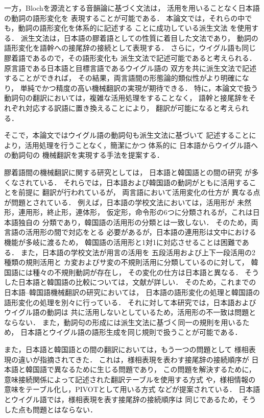 一方，Bloch\cite{BLOCH}を源流とする音韻論に基づく文法は，
活用を用いることなく日本語の動詞の語形変化を
表現することが可能である．
本論文では，それらの中でも，動詞の語形変化を体系的に記述する
ことに成功している派生文法\cite{KIYOSE1}\cite{KIYOSE2}
を使用する．
派生文法は，日本語の膠着語としての性質に着目した文法であり，
動詞の語形変化を語幹への接尾辞の接続として表現する．
さらに，ウイグル語も同じ膠着語であるので，その語形変化も
派生文法で記述可能であると考えられる．
原言語である日本語と目標言語であるウイグル語の
双方を共に派生文法で記述することができれば，
その結果，両言語間の形態論的類似性がより明確になり，
単純でかつ精度の高い機械翻訳の実現が期待できる．
特に，本論文で扱う動詞句の翻訳においては，複雑な活用処理をすることなく，
語幹と接尾辞をそれぞれ対応する訳語に置き換えることにより，
翻訳が可能になると考えられる．

そこで，本論文ではウイグル語の動詞句も派生文法に基づいて
記述することにより，活用処理を行うことなく，簡潔にかつ
体系的に
日本語からウイグル語への動詞句の
機械翻訳を実現する手法を提案する．

膠着語間の機械翻訳に関する研究としては，
日本語と韓国語との間の研究\cite{H_LEE1990}\cite{S_LEE1992}
\cite{J_KIM1996_2}\cite{J_KIM1998}が多くなされている．
それらでは，日本語および韓国語の動詞がともに活用することを前提に
翻訳が行われているが，
両言語において活用変化の仕方が
異なる点が問題とされている．
例えば，日本語の学校文法においては，活用形が
未然形，連用形，終止形，連体形，
仮定形，命令形の6つに分類されるが，これは日本語独自の
分類であり，韓国語の活用形の分類とは一致しない．
そのため，両言語の活用形の間で対応をとる
必要があるが，日本語の連用形は文中における機能が多岐に渡るため，
韓国語の活用形と1対1に対応させることは困難である．
また，日本語の学校文法が用言の活用を
五段活用および上下一段活用の2種類の規則活用と
カ変およびサ変の不規則活用に分類しているのに対して，
韓国語には種々の不規則動詞が存在し，
その変化の仕方は日本語と異なる．
そうした日本語と韓国語の比較については，文献\cite{J_KIM1996_2}が詳しい．
そのため，これまでの日本語--韓国語機械翻訳の研究においては，
日本語の語形変化の処理と韓国語の語形変化の処理を別々に行っている．
それに対して本研究では，日本語およびウイグル語の動詞は
共に活用しないとしているため，活用形の不一致は問題とならない．
また，動詞句の形成には派生文法に基づく同一の規則を用いるため，
日本語とウイグル語の語形生成を同じ規則で扱うことが可能である．

また，日本語と韓国語との間の翻訳においては，もう一つの問題として
様相表現の違いが指摘されてきた．
これは，様相表現を表わす接尾辞の接続順序が
日本語と韓国語で異なるために生じる問題であり，
この問題を解決するために，
意味接続関係によって記述された翻訳テーブルを使用する方式\cite{J_KIM1996_2}
や，様相情報の意味をテーブル化し，PIVOTとして用いる方式
\cite{J_KIM1998}などが提案されている．
日本語とウイグル語では，様相表現を表す接尾辞の接続順序は
同じであるため，そうした点も問題とはならない．

